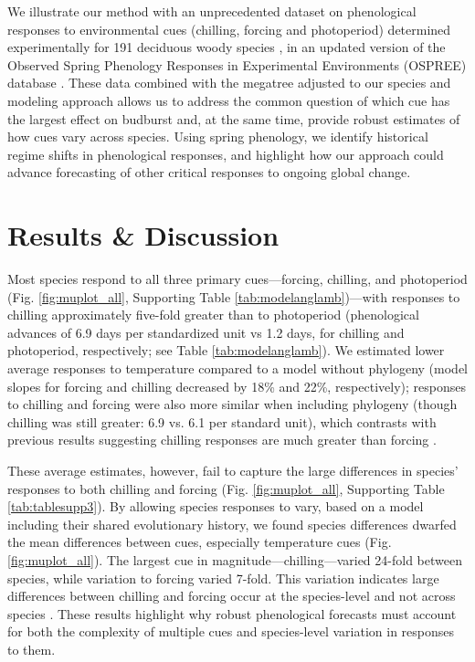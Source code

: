 \documentclass[11pt]{article}
\begin{document}
We illustrate our method with an unprecedented dataset on phenological responses to environmental cues (chilling, forcing and photoperiod) determined experimentally for 191 deciduous woody species \cite[by far the most studied group of species in phenology experiments, see][]{ettinger2020}, in an updated version of the Observed Spring Phenology Responses in Experimental Environments (OSPREE) database \citep{wolkovich2019}. These data combined with the \citet{smith2018constructing} megatree adjusted to our species and modeling approach allows us to address the common question of which cue has the largest effect on budburst and, at the same time, provide robust estimates of how cues vary across species. Using spring phenology, we identify historical regime shifts \citep{uyeda2017evolution} in phenological responses, and highlight how our approach could advance forecasting of other critical responses to ongoing global change.





\section*{Results \& Discussion}
Most species respond to all three primary cues---forcing, chilling, and photoperiod (Fig. \ref{fig:muplot_all}, Supporting Table \ref{tab:modelanglamb})---with responses to chilling approximately five-fold greater than to photoperiod (phenological advances of 6.9 days per standardized unit vs 1.2 days, for chilling and photoperiod, respectively; see Table \ref{tab:modelanglamb}). We estimated lower average responses to temperature compared to a model without phylogeny (model slopes for forcing and chilling decreased by 18\% and 22\%, respectively); responses to chilling and forcing were also more similar when including phylogeny (though chilling was still greater: 6.9 vs. 6.1 per standard unit), which contrasts with previous results suggesting chilling responses are much greater than forcing  \citep{Laube:2014a,ettinger2020}. 

These average estimates, however, fail to capture the large differences in species' responses to both chilling and forcing (Fig. \ref{fig:muplot_all}, Supporting Table \ref{tab:tablesupp3}). By allowing species responses to vary, based on a model including their shared evolutionary history, we found species differences dwarfed the mean differences between cues, especially temperature cues (Fig. \ref{fig:muplot_all}). The largest cue in magnitude---chilling---varied 24-fold between species, while variation to forcing varied 7-fold. This variation indicates large differences between chilling and forcing occur at the species-level and not across species \citep[as previously suggested][]{Laube:2014a,ettinger2020}. These results highlight why robust phenological forecasts must account for both the complexity of multiple cues and species-level variation in responses to them.
\end{document}
